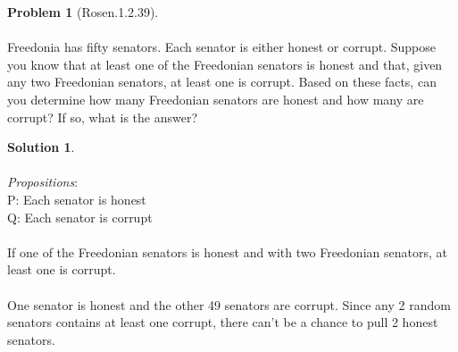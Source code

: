 \documentclass{article}
\theoremstyle{definition}
\newtheorem*{problem}{Problem}
\newtheorem*{solution}{Solution}
\begin{document}
\begin{problem}[Rosen.1.2.39]\ \\
\ \\
Freedonia has fifty senators. Each senator is either honest
or corrupt. Suppose you know that at least one of the Freedonian
senators is honest and that, given any two Freedonian
senators, at least one is corrupt. Based on these
facts, can you determine how many Freedonian senators
are honest and how many are corrupt? If so, what is the
answer?\ \\
\begin{compactenum}
\renewcommand{\theenumi}{\alph{enumi}}
\end{compactenum}
\end{problem}

\begin{solution}\ \\
\ \\
\textit{Propositions}:\ \\
P: Each senator is honest\ \\
Q: Each senator is corrupt\ \\
\ \\
If one of the Freedonian senators is honest and with two Freedonian senators, at least one is corrupt.\ \\
\ \\
One senator is honest and the other 49 senators are corrupt. Since any 2 random senators contains at least one corrupt, there can't be a chance to pull 2 honest senators.\ \\
\ \\
\begin{compactenum}
\renewcommand{\theenumi}{\alph{enumi}}  





\end{compactenum}
\end{solution}
\end{document}
